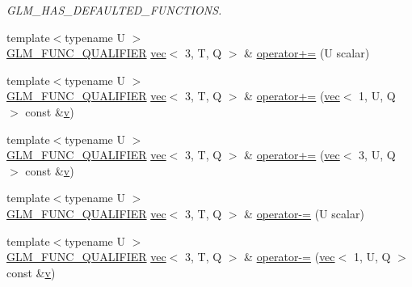 \begin{DoxyCompactItemize}
\begin{DoxyCompactList}\small\item\em G\+L\+M\+\_\+\+H\+A\+S\+\_\+\+D\+E\+F\+A\+U\+L\+T\+E\+D\+\_\+\+F\+U\+N\+C\+T\+I\+O\+NS. \end{DoxyCompactList}\item 
{\footnotesize template$<$typename U $>$ }\\\hyperlink{setup_8hpp_a33fdea6f91c5f834105f7415e2a64407}{G\+L\+M\+\_\+\+F\+U\+N\+C\+\_\+\+Q\+U\+A\+L\+I\+F\+I\+ER} \hyperlink{structglm_1_1vec}{vec}$<$ 3, T, Q $>$ \& \hyperlink{structglm_1_1vec_3_013_00_01_t_00_01_q_01_4_acb693fdeaa576d503444ee370c423cf3}{operator+=} (U scalar)
\item 
{\footnotesize template$<$typename U $>$ }\\\hyperlink{setup_8hpp_a33fdea6f91c5f834105f7415e2a64407}{G\+L\+M\+\_\+\+F\+U\+N\+C\+\_\+\+Q\+U\+A\+L\+I\+F\+I\+ER} \hyperlink{structglm_1_1vec}{vec}$<$ 3, T, Q $>$ \& \hyperlink{structglm_1_1vec_3_013_00_01_t_00_01_q_01_4_aeed08e334ed3515bdb2050d15877bbe8}{operator+=} (\hyperlink{structglm_1_1vec}{vec}$<$ 1, U, Q $>$ const \&\hyperlink{_s_d_l__opengl_8h_a10a82eabcb59d2fcd74acee063775f90}{v})
\item 
{\footnotesize template$<$typename U $>$ }\\\hyperlink{setup_8hpp_a33fdea6f91c5f834105f7415e2a64407}{G\+L\+M\+\_\+\+F\+U\+N\+C\+\_\+\+Q\+U\+A\+L\+I\+F\+I\+ER} \hyperlink{structglm_1_1vec}{vec}$<$ 3, T, Q $>$ \& \hyperlink{structglm_1_1vec_3_013_00_01_t_00_01_q_01_4_a6e025799ccd139ed94645bf141eed279}{operator+=} (\hyperlink{structglm_1_1vec}{vec}$<$ 3, U, Q $>$ const \&\hyperlink{_s_d_l__opengl_8h_a10a82eabcb59d2fcd74acee063775f90}{v})
\item 
{\footnotesize template$<$typename U $>$ }\\\hyperlink{setup_8hpp_a33fdea6f91c5f834105f7415e2a64407}{G\+L\+M\+\_\+\+F\+U\+N\+C\+\_\+\+Q\+U\+A\+L\+I\+F\+I\+ER} \hyperlink{structglm_1_1vec}{vec}$<$ 3, T, Q $>$ \& \hyperlink{structglm_1_1vec_3_013_00_01_t_00_01_q_01_4_a806d4a3b1fa79272d2b5ca58c62b95c1}{operator-\/=} (U scalar)
\item 
{\footnotesize template$<$typename U $>$ }\\\hyperlink{setup_8hpp_a33fdea6f91c5f834105f7415e2a64407}{G\+L\+M\+\_\+\+F\+U\+N\+C\+\_\+\+Q\+U\+A\+L\+I\+F\+I\+ER} \hyperlink{structglm_1_1vec}{vec}$<$ 3, T, Q $>$ \& \hyperlink{structglm_1_1vec_3_013_00_01_t_00_01_q_01_4_ac0d8da1814d255fc6876b12519cccfb8}{operator-\/=} (\hyperlink{structglm_1_1vec}{vec}$<$ 1, U, Q $>$ const \&\hyperlink{_s_d_l__opengl_8h_a10a82eabcb59d2fcd74acee063775f90}{v})

\end{DoxyCompactItemize}
